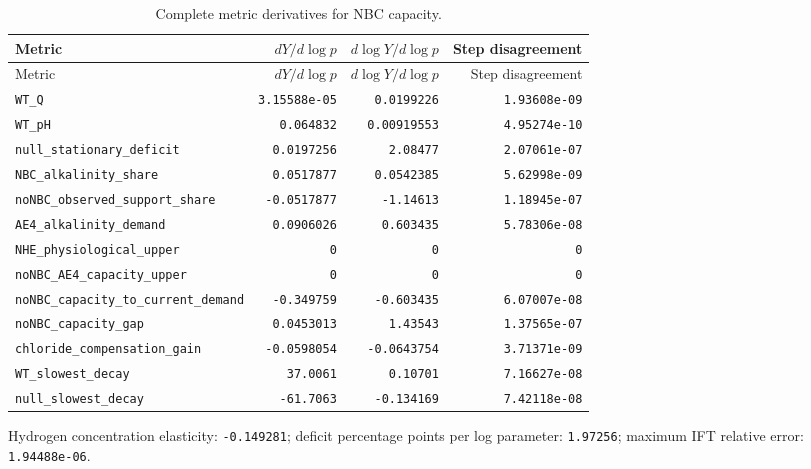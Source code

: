 \begingroup\scriptsize
\setlength{\tabcolsep}{3pt}
\begin{longtable}{p{.44\linewidth}rrr}
\caption{Complete metric derivatives for NBC capacity.}\\
\toprule
Metric & $dY/d\log p$ & $d\log Y/d\log p$ & Step disagreement \\
\midrule\endfirsthead
\toprule
Metric & $dY/d\log p$ & $d\log Y/d\log p$ & Step disagreement \\
\midrule\endhead
\bottomrule\endfoot
\nolinkurl{WT_Q} & \texttt{3.15588e-05} & \texttt{0.0199226} & \texttt{1.93608e-09} \\
\nolinkurl{WT_pH} & \texttt{0.064832} & \texttt{0.00919553} & \texttt{4.95274e-10} \\
\nolinkurl{null_stationary_deficit} & \texttt{0.0197256} & \texttt{2.08477} & \texttt{2.07061e-07} \\
\nolinkurl{NBC_alkalinity_share} & \texttt{0.0517877} & \texttt{0.0542385} & \texttt{5.62998e-09} \\
\nolinkurl{noNBC_observed_support_share} & \texttt{-0.0517877} & \texttt{-1.14613} & \texttt{1.18945e-07} \\
\nolinkurl{AE4_alkalinity_demand} & \texttt{0.0906026} & \texttt{0.603435} & \texttt{5.78306e-08} \\
\nolinkurl{NHE_physiological_upper} & \texttt{0} & \texttt{0} & \texttt{0} \\
\nolinkurl{noNBC_AE4_capacity_upper} & \texttt{0} & \texttt{0} & \texttt{0} \\
\nolinkurl{noNBC_capacity_to_current_demand} & \texttt{-0.349759} & \texttt{-0.603435} & \texttt{6.07007e-08} \\
\nolinkurl{noNBC_capacity_gap} & \texttt{0.0453013} & \texttt{1.43543} & \texttt{1.37565e-07} \\
\nolinkurl{chloride_compensation_gain} & \texttt{-0.0598054} & \texttt{-0.0643754} & \texttt{3.71371e-09} \\
\nolinkurl{WT_slowest_decay} & \texttt{37.0061} & \texttt{0.10701} & \texttt{7.16627e-08} \\
\nolinkurl{null_slowest_decay} & \texttt{-61.7063} & \texttt{-0.134169} & \texttt{7.42118e-08} \\
\end{longtable}
\endgroup

Hydrogen concentration elasticity: \texttt{-0.149281}; deficit percentage points per log parameter: \texttt{1.97256}; maximum IFT relative error: \texttt{1.94488e-06}.\par

